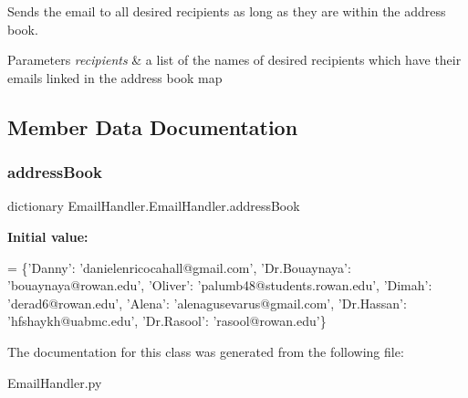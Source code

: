 Sends the email to all desired recipients as long as they are within the address book. 


\begin{DoxyParams}{Parameters}
{\em recipients} & a list of the names of desired recipients which have their emails linked in the address book map \\
\hline
\end{DoxyParams}


\subsection{Member Data Documentation}
\mbox{\label{classEmailHandler_1_1EmailHandler_a6caaf424571b574950b15341ed2209a4}} 
\subsubsection{\texorpdfstring{address\+Book}{addressBook}}
{\footnotesize\ttfamily dictionary Email\+Handler.\+Email\+Handler.\+address\+Book\hspace{0.3cm}{\ttfamily [static]}}

{\bfseries Initial value\+:}
\begin{DoxyCode}
=  \{\textcolor{stringliteral}{'Danny'}: \textcolor{stringliteral}{'danielenricocahall@gmail.com'}, 
         \textcolor{stringliteral}{'Dr.Bouaynaya'}: \textcolor{stringliteral}{'bouaynaya@rowan.edu'}, 
         \textcolor{stringliteral}{'Oliver'}: \textcolor{stringliteral}{'palumb48@students.rowan.edu'},
         \textcolor{stringliteral}{'Dimah'}: \textcolor{stringliteral}{'derad6@rowan.edu'},
         \textcolor{stringliteral}{'Alena'}: \textcolor{stringliteral}{'alenagusevarus@gmail.com'},
         \textcolor{stringliteral}{'Dr.Hassan'}: \textcolor{stringliteral}{'hfshaykh@uabmc.edu'},
         \textcolor{stringliteral}{'Dr.Rasool'}: \textcolor{stringliteral}{'rasool@rowan.edu'}\}
\end{DoxyCode}


The documentation for this class was generated from the following file\+:\begin{DoxyCompactItemize}
\item 
Email\+Handler.\+py\end{DoxyCompactItemize}
